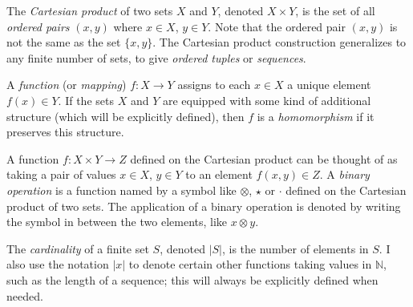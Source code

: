 \documentclass[../generics]{subfiles}
\begin{document}
The \emph{Cartesian product} of two sets $X$ and $Y$, denoted \index{$\times$}$X\times Y$, is the set of all \emph{ordered pairs} $(x,y)$ where $x\in X$, $y\in Y$. Note that the ordered pair $(x,y)$ is not the same as the set $\{x,y\}$. The Cartesian product construction generalizes to any finite number of sets, to give \emph{ordered tuples} or \emph{sequences}.

A \emph{function} (or \emph{mapping}) $f\colon X\rightarrow Y$ assigns to each $x\in X$ a unique element $f(x)\in Y$. If the sets $X$ and $Y$ are equipped with some kind of additional structure (which will be explicitly defined), then $f$ is a \emph{homomorphism} if it preserves this structure.

A function $f\colon X\times Y\rightarrow Z$ defined on the Cartesian product can be thought of as taking a pair of values $x\in X$, $y\in Y$ to an element $f(x,y)\in Z$. A \emph{binary operation} is a function named by a symbol like $\otimes$, $\star$ or $\cdot$ defined on the Cartesian product of two sets. The application of a binary operation is denoted by writing the symbol in between the two elements, like $x\otimes y$.

The \emph{cardinality} of a finite set $S$, denoted $|S|$, is the number of elements in $S$. I also use the notation $|x|$ to denote certain other functions taking values in $\mathbb{N}$, such as the length of a sequence; this will always be explicitly defined when needed.
\end{document}
